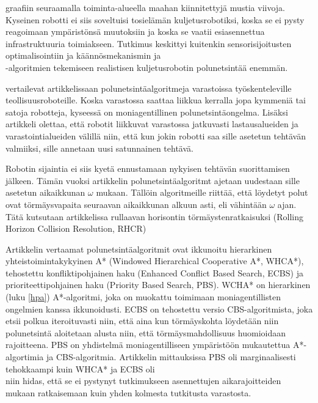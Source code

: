 graafiin seuraamalla toiminta-alueella maahan kiinnitettyjä mustia viivoja. 
Kyseinen robotti ei siis soveltuisi tosielämän kuljetusrobotiksi, koska se 
ei pysty reagoimaan ympäristönsä muutoksiin ja koska se vaatii esiasennettua 
infrastruktuuria toimiakseen. Tutkimus keskittyi kuitenkin sensorisijoitusten 
optimalisointiin ja käännösmekanismin ja \\ -algoritmien tekemiseen realistisen 
kuljetusrobotin polunetsintää enemmän. \par
	\textcite{warehouse} vertailevat artikkelissaan 
polunetsintäalgoritmeja varastoissa työskenteleville teollisuusroboteille. 
Koska varastossa saattaa liikkua kerralla jopa kymmeniä tai satoja robotteja, 
kyseessä on moniagentillinen polunetsintäongelma. Lisäksi artikkeli olettaa, 
että robotit liikkuvat varastossa jatkuvasti lastausalueiden ja 
varastointialueiden välillä niin, että kun jokin robotti saa sille asetetun 
tehtävän valmiiksi, sille annetaan uusi satunnainen tehtävä. \par
	Robotin sijaintia ei siis kyetä ennustamaan nykyisen tehtävän 
suorittamisen jälkeen. Tämän vuoksi artikkelin polunetsintäalgoritmt ajetaan 
uudestaan sille asetetun aikaikkunan $\omega$ mukaan. Tällöin algoritmeille 
riittää, että löydetyt polut ovat törmäysvapaita seuraavan aikaikkunan alkuun 
asti, eli vähintään $\omega$ ajan. Tätä kutsutaan artikkelissa rullaavan 
horisontin törmäystenratkaisuksi (Rolling Horizon Collision Resolution, 
RHCR)\par
	Artikkelin vertaamat polunetsintäalgoritmit ovat ikkunoitu 
hierarkinen yhteistoimintakykyinen A* (Windowed Hierarchical Cooperative A*, 
WHCA*), tehostettu konfliktipohjainen haku (Enhanced Conflict Based Search, 
ECBS) ja prioriteetti\-poh\-jainen haku (Priority Based Search, PBS). WCHA* on 
hierarkinen (luku \ref{hpa}) A*-algoritmi, joka on muokattu toimimaan 
moniagentillisten ongelmien kanssa ik\-ku\-noi\-dus\-ti. ECBS on tehostettu 
versio CBS-algoritmista, joka etsii polkua iteroituvasti niin, että aina kun 
törmäyskohta löydetään niin polunetsintä aloitetaan alusta niin, että 
törmäysmahdollisuus huomioidaan rajoitteena. PBS on yhdistelmä 
moniagentilliseen ympäristöön mukautettua A*-algortimia ja CBS-algoritmia. 
Artikkelin mittauksissa PBS oli marginaalisesti tehokkaampi kuin WHCA* ja 
ECBS oli \\ niin hidas, että se ei pystynyt tutkimukseen asennettujen 
aikarajoitteiden mukaan ratkaisemaan kuin yhden kolmesta tutkitusta 
varastosta.
